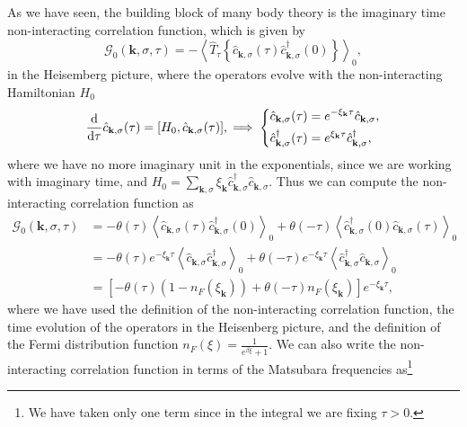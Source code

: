 As we have seen, the building block of many body theory is the imaginary time non-interacting correlation function, which is given by
\[
    \mathcal{G}_0(\mathbf{k}, \sigma, \tau) = - \left\langle \hat{T}_{\tau} \left\{ \hat{c}_{\mathbf{k}, \sigma}(\tau) \hat{c}_{\mathbf{k}, \sigma}^\dagger(0) \right\} \right\rangle_0,
\]
in the Heisemberg picture, where the operators evolve with the non-interacting Hamiltonian \(H_0\)
\[
    \frac{\mathrm{d}}{\mathrm{d} \tau} \hat{c}_{\mathbf{k}, \sigma}(\tau) = [H_0, \hat{c}_{\mathbf{k}, \sigma}(\tau)], \implies \begin{dcases}
        \hat{c}_{\mathbf{k}, \sigma}(\tau) = e^{-\xi_{\mathbf{k}} \tau} \hat{c}_{\mathbf{k}, \sigma}, \\
        \hat{c}^{\dagger}_{\mathbf{k}, \sigma}(\tau) = e^{\xi_{\mathbf{k}} \tau} \hat{c}^{\dagger}_{\mathbf{k}, \sigma},
    \end{dcases}
\]
where we have no more imaginary unit in the exponentials, since we are working with imaginary time, and \(H_0 = \sum_{\mathbf{k}, \sigma} \xi_{\mathbf{k}} \hat{c}_{\mathbf{k}, \sigma}^\dagger \hat{c}_{\mathbf{k}, \sigma}\). Thus we can compute the non-interacting correlation function as
\[
    \begin{aligned}
        \mathcal{G}_0(\mathbf{k}, \sigma, \tau) & = - \theta(\tau) \left\langle \hat{c}_{\mathbf{k}, \sigma}(\tau) \hat{c}_{\mathbf{k}, \sigma}^\dagger(0) \right\rangle_0 + \theta(-\tau) \left\langle \hat{c}_{\mathbf{k}, \sigma}^\dagger(0) \hat{c}_{\mathbf{k}, \sigma}(\tau) \right\rangle_0                                     \\
                                                & = - \theta(\tau) e^{-\xi_{\mathbf{k}} \tau} \left\langle \hat{c}_{\mathbf{k}, \sigma} \hat{c}_{\mathbf{k}, \sigma}^\dagger \right\rangle_0 + \theta(-\tau) e^{-\xi_{\mathbf{k}} \tau} \left\langle \hat{c}_{\mathbf{k}, \sigma}^\dagger \hat{c}_{\mathbf{k}, \sigma} \right\rangle_0 \\
                                                & = \left[ - \theta(\tau) (1 - n_F(\xi_{\mathbf{k}})) + \theta(-\tau) n_F(\xi_{\mathbf{k}})\right] e^{-\xi_{\mathbf{k}} \tau} ,
    \end{aligned}
\]
where we have used the definition of the non-interacting correlation function, the time evolution of the operators in the Heisenberg picture, and the definition of the Fermi distribution function \(n_F(\xi) = \frac{1}{e^{\beta \xi} + 1}\). We can also write the non-interacting correlation function in terms of the Matsubara frequencies as\footnote{We have taken only one term since in the integral we are fixing \(\tau > 0\).}
